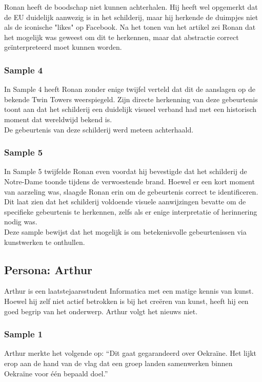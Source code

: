 Ronan heeft de boodschap niet kunnen achterhalen. Hij heeft wel opgemerkt dat de EU duidelijk aanwezig is in het schilderij, maar hij herkende de duimpjes niet als de iconische "likes" op Facebook. Na het tonen van het artikel zei Ronan dat het mogelijk was geweest om dit te herkennen, maar dat abstractie correct geïnterpreteerd moet kunnen worden.

\subsubsection{Sample 4}
In Sample 4 heeft Ronan zonder enige twijfel verteld dat dit de aanslagen op de bekende Twin Towers weerspiegeld. Zijn directe herkenning van deze gebeurtenis toont aan dat het schilderij een duidelijk visueel verband had met een historisch moment dat wereldwijd bekend is. \\

De gebeurtenis van deze schilderij werd meteen achterhaald.

\subsubsection{Sample 5}
In Sample 5 twijfelde Ronan even voordat hij bevestigde dat het schilderij de Notre-Dame toonde tijdens de verwoestende brand. Hoewel er een kort moment van aarzeling was, slaagde Ronan erin om de gebeurtenis correct te identificeren. Dit laat zien dat het schilderij voldoende visuele aanwijzingen bevatte om de specifieke gebeurtenis te herkennen, zelfs als er enige interpretatie of herinnering nodig was. \\

Deze sample bewijst dat het mogelijk is om betekenisvolle gebeurtenissen via kunstwerken te onthullen. 


\subsection{Persona: Arthur}
Arthur is een laatstejaarsstudent Informatica met een matige kennis van kunst. Hoewel hij zelf niet actief betrokken is bij het creëren van kunst, heeft hij een goed begrip van het onderwerp. Arthur volgt het nieuws niet. 

\subsubsection{Sample 1}
Arthur merkte het volgende op: ``Dit gaat gegarandeerd over Oekraïne. Het lijkt erop aan de hand van de vlag dat een groep landen samenwerken binnen Oekraïne voor één bepaald doel.'' \\


